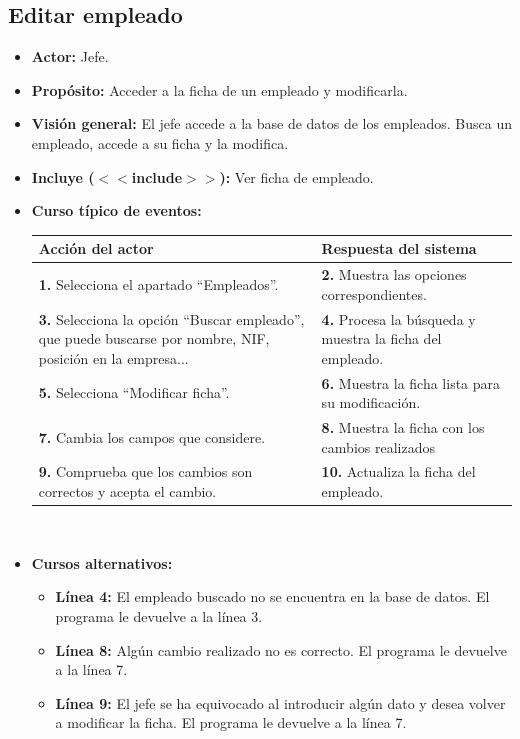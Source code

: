\documentclass[spanish,a4paper,11pt, twoside]{report}	%
\begin{document}

	\subsection{Editar empleado}		
			\begin{itemize}
			\item \textbf{Actor:} Jefe.
			\item \textbf{Propósito:} Acceder a la ficha de un empleado y modificarla.
			\item \textbf{Visión general:} El jefe accede a la base de datos de los empleados. 
				Busca un empleado, accede a su ficha y la modifica. 
			\item \textbf{Incluye ($<<$include$>>$):} Ver ficha de empleado.
			\item \textbf{Curso típico de eventos:} 	\\
				\begin{tabular}{|p{6cm}||p{6cm}|}
				\hline
				\textbf{Acción del actor} & \textbf{Respuesta del sistema} \\ \hline \hline
				\textbf{1.} Selecciona el apartado ``Empleados''. & 
				\textbf{2.} Muestra las opciones correspondientes. \\ \hline
				\textbf{3.} Selecciona la opción ``Buscar empleado'', que puede buscarse por nombre, NIF, 
					posición en la empresa...	& 
				\textbf{4.} Procesa la búsqueda y muestra la ficha del empleado. \\ \hline
				\textbf{5.} Selecciona ``Modificar ficha''. & 
				\textbf{6.} Muestra la ficha lista para su modificación.\\ \hline
				\textbf{7.} Cambia los campos que considere. & 
				\textbf{8.} Muestra la ficha con los cambios realizados \\ \hline
				\textbf{9.} Comprueba que los cambios son correctos y acepta el cambio. & 
				\textbf{10. }Actualiza la ficha del empleado. \\ \hline
			\end{tabular}
			\\
			\item \textbf{Cursos alternativos:} 
			\begin{itemize}
				\item  \textbf{Línea 4:} El empleado buscado no se encuentra en la base de
					datos. El programa le devuelve a la línea 3.
				\item  \textbf{Línea 8:} Algún cambio realizado no es correcto. El programa le
					devuelve a la línea 7.
				\item  \textbf{Línea 9:} El jefe se ha equivocado al introducir algún dato y
					desea volver a modificar la ficha. El programa le devuelve a la línea 7.
			
			\end {itemize}
		\end{itemize}
\end{document}
